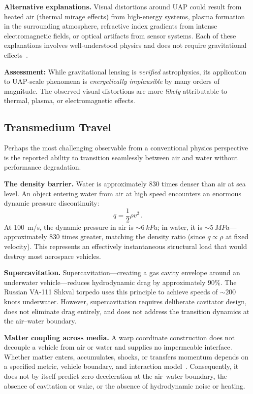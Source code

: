 \documentclass[aps,prd,twocolumn,superscriptaddress,nofootinbib,floatfix]{revtex4-2}
\begin{document}
\textbf{Alternative explanations.} Visual distortions around UAP could result from
heated air (thermal mirage effects) from high-energy systems, plasma formation in
the surrounding atmosphere, refractive index gradients from intense
electromagnetic fields, or optical artifacts from sensor systems. Each of these
explanations involves well-understood physics and does not require gravitational
effects~\cite{Condign2000,AARO_Parallax2024}.

\textbf{Assessment:} While gravitational lensing is \emph{verified} astrophysics,
its application to UAP-scale phenomena is \emph{energetically implausible} by many
orders of magnitude. The observed visual distortions are more \emph{likely}
attributable to thermal, plasma, or electromagnetic effects.

\subsection{Transmedium Travel}\label{sec:transmedium}

Perhaps the most challenging observable from a conventional physics perspective is
the reported ability to transition seamlessly between air and water without
performance degradation.

\textbf{The density barrier.} Water is approximately 830 times denser than air at
sea level. An object entering water from air at high speed encounters an enormous
dynamic pressure discontinuity:
\begin{equation}\label{eq:dynamic-pressure}
  q = \frac{1}{2}\rho v^{2}\,.
\end{equation}
At \SI{100}{m/s}, the dynamic pressure in air is ${\sim}\SI{6}{kPa}$; in water,
it is ${\sim}\SI{5}{MPa}$---approximately 830 times greater, matching the density
ratio (since $q \propto \rho$ at fixed velocity). This represents an effectively
instantaneous structural load that would destroy most aerospace vehicles.

\textbf{Supercavitation.} Supercavitation---creating a gas cavity envelope around
an underwater vehicle---reduces hydrodynamic drag by approximately 90\%. The
Russian VA-111 Shkval torpedo uses this principle to achieve speeds of
${\sim}200$ knots underwater. However, supercavitation requires deliberate
cavitator design, does not eliminate drag entirely, and does not address the
transition dynamics at the air--water boundary.

\textbf{Matter coupling across media.} A warp coordinate construction does not
decouple a vehicle from air or water and supplies no impermeable interface.
Whether matter enters, accumulates, shocks, or transfers momentum depends on a
specified metric, vehicle boundary, and interaction model~\cite{Alcubierre1994}.
Consequently, it does not by itself predict zero deceleration at the air--water
boundary, the absence of cavitation or wake, or the absence of hydrodynamic noise
or heating.
\end{document}
